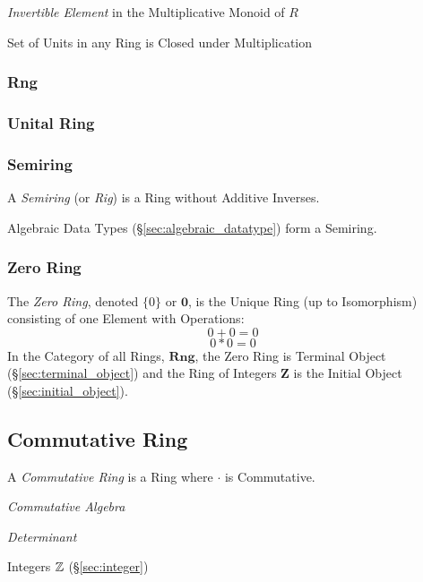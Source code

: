 \emph{Invertible Element} in the Multiplicative Monoid of $R$

Set of Units in any Ring is Closed under Multiplication



\subsubsection{Rng}\label{sec:rng}

\subsubsection{Unital Ring}\label{sec:unital_ring}

\subsubsection{Semiring}\label{sec:semiring}

A \emph{Semiring} (or \emph{Rig}) is a Ring without Additive Inverses.

Algebraic Data Types (\S\ref{sec:algebraic_datatype}) form a Semiring.



\subsubsection{Zero Ring}\label{sec:zero_ring}

The \emph{Zero Ring}, denoted $\{0\}$ or $\mathbf{0}$, is the Unique Ring
(up to Isomorphism) consisting of one Element with Operations:
\[
    0 + 0 = 0
\] \[
    0 * 0 = 0
\]
In the Category of all Rings, $\mathbf{Rng}$, the Zero Ring is
Terminal Object (\S\ref{sec:terminal_object}) and the Ring of Integers
$\mathbf{Z}$ is the Initial Object (\S\ref{sec:initial_object}).



\subsection{Commutative Ring}\label{sec:commutative_ring}

A \emph{Commutative Ring} is a Ring where $\cdot$ is Commutative.

\emph{Commutative Algebra}

\emph{Determinant}

Integers $\mathbb{Z}$ (\S\ref{sec:integer})

